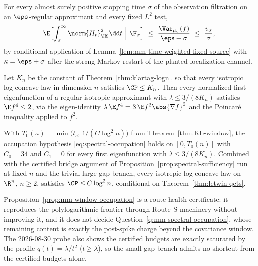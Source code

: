 \documentclass[../../main.tex]{subfiles}
\begin{document}
\begin{lemma}
\label{lem:mm-restart-deweighting}
For every almost surely positive stopping time $\sigma$ of the observation filtration on an
$\eps$-regular approximant and every fixed $L^2$ test,
\[
  \E\Bigl[\int_\sigma^\infty\norm{H_t}_{\HS}^2\dd t\ \Big|\ \F_\sigma\Bigr]
  \ \le\ \frac{\Var_{\mu_\sigma}(f)}{\eps+\sigma}\ \le\ \frac{v_\sigma}{\sigma},
\]
by conditional application of Lemma~\ref{lem:mm-time-weighted-fixed-source} with
$\kappa=\eps+\sigma$ after the strong-Markov restart of the planted localization channel.
\end{lemma}

\begin{lemma}
\label{lem:mm-smallgap-fourth-moment}
Let $K_n$ be the constant of Theorem~\ref{thm:klartag-logn}, so that every isotropic
log-concave law in dimension $n$ satisfies $\CP\le K_n$. Then every normalized first
eigenfunction of a regular isotropic approximant with $\lambda\le 3/(8K_n)$ satisfies
$\E f^4\le2$, via the eigen-identity $\lambda\,\E f^4=3\,\E f^2\abs{\nabla f}^2$ and the
Poincar\'e inequality applied to $f^2$.
\end{lemma}

\begin{proposition}
\label{prop:mm-window-occupation}
With $T_0(n)=\min\bigl(t_c,\,1/(\bar C\log^2n)\bigr)$ from Theorem~\ref{thm:KL-window}, the
occupation hypothesis \eqref{eq:spectral-occupation} holds on $[0,T_0(n)]$ with $C_0=34$ and
$C_1=0$ for every first eigenfunction with $\lambda\le3/(8K_n)$. Combined with the certified
bridge argument of Proposition~\ref{prop:spectral-sufficiency} run at fixed $n$ and the trivial
large-gap branch, every isotropic log-concave law on $\R^n$, $n\ge2$, satisfies $\CP\le C\log^2n$, conditional on
Theorem~\ref{thm:letwin-qcts}.
\end{proposition}

Proposition~\ref{prop:mm-window-occupation} is a route-health certificate: it reproduces the
polylogarithmic frontier through Route~S machinery without improving it, and it does not decide
Question~\ref{q:mm-spectral-occupation}, whose remaining content is exactly the post-spike
charge beyond the covariance window. The 2026-08-30 probe also shows the certified budgets are
exactly saturated by the profile $q(t)=\lambda/t^2$ ($t\ge\lambda$), so the small-gap branch
admits no shortcut from the certified budgets alone.
\end{document}
